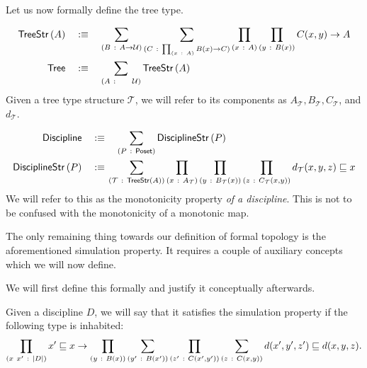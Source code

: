 Let us now formally define the tree type.
\begin{defn}
  \begin{align*}
    \treestr{A} &\quad\is\quad
      \sigmaty{B}{A \rightarrow \univ}{
        \sigmaty{C}{\pity{x}{A}{B(x) \rightarrow C}}{
          \pity{x}{A}{\pity{y}{B(x)}{C(x, y) \rightarrow A}}
        }
      }\\
    \mathsf{Tree} &\quad\is\quad \sigmaty{A}{~~~~\univ}{\treestr{A}}
  \end{align*}
  Given a tree type structure $\mathcal{T}$, we will refer to its components as
  $A_{\mathcal{T}}, B_{\mathcal{T}}, C_{\mathcal{T}}$, and $d_{\mathcal{T}}$.
\end{defn}

\begin{defn}[Discipline]
  \begin{align*}
    \mathsf{Discipline} \quad&\is\quad \sigmaty{P}{\poset{}}{\disciplinestr{P}}                 \\
    \disciplinestr{P}   \quad&\is\quad \hspace{-0.9em}\sigmaty{\mathcal{T}}{\treestr{A}}{
      \pity{x}{A_{\mathcal{T}}}{\pity{y}{B_{\mathcal{T}}(x)}{
          \pity{z}{C_{\mathcal{T}}(x, y)}{d_{\mathcal{T}}(x, y, z) \sqsubseteq x}}
      }
    }
  \end{align*}
  We will refer to this as the monotonicity property \emph{of a discipline}. This is not
  to be confused with the monotonicity of a monotonic map.
\end{defn}

The only remaining thing towards our definition of formal topology is the aforementioned
simulation property. It requires a couple of auxiliary concepts which we will now define.

We will first define this formally and justify it conceptually afterwards.
\begin{defn}
  Given a discipline $D$, we will say that it satisfies the simulation property if the
  following type is inhabited:
  \begin{equation*}
    \pity{x~x'}{\abs{D}}{
      x' \sqsubseteq x \rightarrow \pity{y}{B(x)}{
        \sigmaty{y'}{B(x')}{
          \pity{z'}{C(x', y')}{
            \sigmaty{z}{C(x, y)}{
              d(x', y', z') \sqsubseteq d(x, y, z)
            }
          }
        }
      }
    }.
  \end{equation*}
\end{defn}

